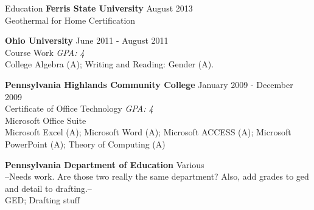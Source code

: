 \documentclass{resume} %
\begin{document}
\begin{rSection}{Education}
{\bf Ferris State University} {August 2013} 
\\ Geothermal for Home Certification {}


{\bf Ohio University} {June 2011 - August 2011} 
\\ Course Work {\em GPA: 4}
\smallskip \\
College Algebra (A); Writing and Reading: Gender (A).

{\bf Pennsylvania Highlands Community College} {January 2009 - December 2009} 
\\ Certificate of Office Technology {\em GPA: 4}
\\ Microsoft Office Suite
\smallskip \\
Microsoft Excel (A); Microsoft Word (A); Microsoft ACCESS (A); Microsoft PowerPoint (A); Theory of Computing (A)

{\bf Pennsylvania Department of Education} {Various} 
\\ --Needs work. Are those two really the same department? Also, add grades to ged and detail to drafting.-- {}
\smallskip \\
GED; Drafting stuff

\end{rSection}

\end{document}
